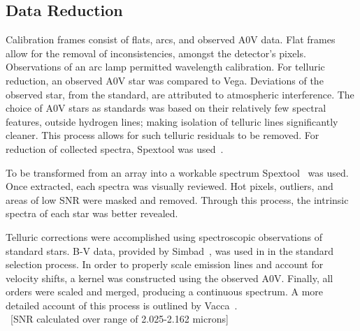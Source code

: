 \subsection{Data Reduction}

Calibration frames consist of flats, arcs, and observed A0V data.  Flat frames allow for the removal of inconsistencies, amongst the detector's pixels.  Observations of an arc lamp permitted wavelength calibration.  For telluric reduction, an observed A0V star was compared to Vega.  Deviations of the observed star, from the standard, are attributed to atmospheric interference.  
The choice of A0V stars as standards was based on their relatively few spectral features, outside hydrogen lines; making isolation of telluric lines significantly cleaner.  
This process allows for such telluric residuals to be removed.  For reduction of collected spectra, Spextool was used~\cite{Cushing_2004}.


To be transformed from an array into a workable spectrum Spextool~\cite{Cushing_2004} was used.  Once extracted, each spectra was visually reviewed.  Hot pixels, outliers, and areas of low SNR were masked and removed.  Through this process, the intrinsic spectra of each star was better revealed.


Telluric corrections were accomplished using spectroscopic observations of standard stars. B-V data, provided by Simbad~\cite{simbad}, was used in in the standard selection process.
In order to properly scale emission lines and account for velocity shifts, a kernel was constructed using the observed A0V.  Finally, all orders were scaled and merged, producing a continuous spectrum.
A more detailed account of this process is outlined by Vacca~\cite{Vacca_2003}.\\



~[SNR calculated over range of 2.025-2.162 microns]\\